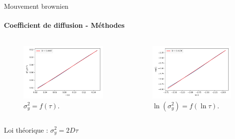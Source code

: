 \documentclass[11pt]{beamer}
\begin{document}
\begin{frame}{Mouvement brownien}
\framesubtitle{Coefficient de diffusion - Méthodes}
\begin{columns}
	\begin{figure}
\includegraphics[width=1\linewidth]{graphe_y.png}
\caption{$\sigma_y^2 = f(\tau)$. }
\end{figure}
    
        \begin{figure}
        \includegraphics[width=1\linewidth]{graphe_y_log.png}
        \caption{$\ln(\sigma_y^2) = f(\ln\tau)$.}
        \end{figure}
\end{columns}
\vspace{0.5cm}
\centering Loi théorique : $\sigma_y^2 = 2D\tau$\end{frame}
\end{document}
